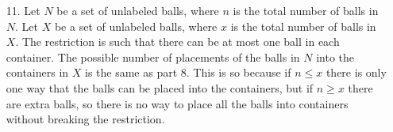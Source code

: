 \documentclass[10pt,a4paper]{report}
\begin{document}
\begin{enumerate}
	\item[11.] Let $N$ be a set of unlabeled balls, where $n$ is the total number of balls in $N$.  Let $X$ be a set of unlabeled balls, where $x$ is the total number of balls in $X$. The restriction is such that there can be at most one ball in each container.  The possible number of placements of the balls in $N$ into the containers in $X$ is the same as part 8.  This is so because if $n\leq x$ there is only one way that the balls can be placed into the containers, but if $n\geq x$ there are extra balls, so there is no way to place all the balls into containers without breaking the restriction.
\end{enumerate}
\end{document}
